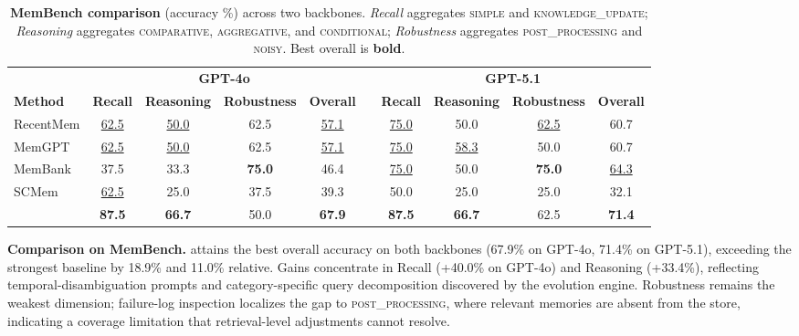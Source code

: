 \begin{table}[t]
\centering
\caption{\textbf{MemBench comparison} (accuracy \%) across two backbones. \textit{Recall} aggregates \textsc{simple} and \textsc{knowledge\_update}; \textit{Reasoning} aggregates \textsc{comparative}, \textsc{aggregative}, and \textsc{conditional}; \textit{Robustness} aggregates \textsc{post\_processing} and \textsc{noisy}. Best overall is \textbf{bold}.}
\label{tab:membench_comparison}
\vspace{0.8em}
\footnotesize 
\setlength{\tabcolsep}{3.5pt} 
\renewcommand{\arraystretch}{1.1}
\begin{tabular}{@{}l cccc p{0.5em} cccc@{}} 
\toprule
& \multicolumn{4}{c}{\textbf{GPT-4o}} && \multicolumn{4}{c}{\textbf{GPT-5.1}} \\
\cmidrule{2-5} \cmidrule{7-10}
\textbf{Method} & \textbf{Recall} & \textbf{Reasoning} & \textbf{Robustness} & \textbf{Overall} && \textbf{Recall} & \textbf{Reasoning} & \textbf{Robustness} & \textbf{Overall} \\
\midrule
RecentMem & \underline{62.5} & \underline{50.0} & 62.5 & \underline{57.1} && \underline{75.0} & 50.0 & \underline{62.5} & 60.7 \\
MemGPT    & \underline{62.5} & \underline{50.0} & 62.5 & \underline{57.1} && \underline{75.0} & \underline{58.3} & 50.0 & 60.7 \\
MemBank   & 37.5 & 33.3 & \textbf{75.0} & 46.4 && \underline{75.0} & 50.0 & \textbf{75.0} & \underline{64.3} \\
SCMem     & \underline{62.5} & 25.0 & 37.5 & 39.3 && 50.0 & 25.0 & 25.0 & 32.1 \\
\ours{}   & \textbf{87.5} & \textbf{66.7} & 50.0 & \textbf{67.9} && \textbf{87.5} & \textbf{66.7} & 62.5 & \textbf{71.4} \\
\bottomrule
\end{tabular}
\vspace{-1.5em}
\end{table}


\noindent \textbf{Comparison on MemBench.} \ours{} attains the best overall accuracy on both backbones (67.9\% on GPT-4o, 71.4\% on GPT-5.1), exceeding the strongest baseline by 18.9\% and 11.0\% relative. Gains concentrate in Recall (+40.0\% on GPT-4o) and Reasoning (+33.4\%), reflecting temporal-disambiguation prompts and category-specific query decomposition discovered by the evolution engine. Robustness remains the weakest dimension; failure-log inspection localizes the gap to \textsc{post\_processing}, where relevant memories are absent from the store, indicating a coverage limitation that retrieval-level adjustments cannot resolve.




